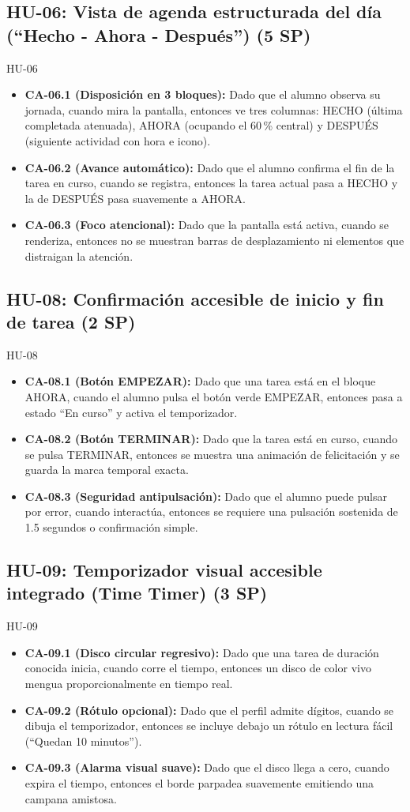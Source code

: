 \documentclass[11pt,a4paper]{article}
\newcommand{\ca}[2]{\item \textbf{#1:} #2}
\begin{document}
\subsection{HU-06: Vista de agenda estructurada del día (``Hecho - Ahora - Después'') (5 SP)}
\begin{criterios}{HU-06}
\begin{itemize}
\ca{CA-06.1 (Disposición en 3 bloques)}{Dado que el alumno observa su jornada, cuando mira la pantalla, entonces ve tres columnas: HECHO (última completada atenuada), AHORA (ocupando el 60\,\% central) y DESPUÉS (siguiente actividad con hora e icono).}
\ca{CA-06.2 (Avance automático)}{Dado que el alumno confirma el fin de la tarea en curso, cuando se registra, entonces la tarea actual pasa a HECHO y la de DESPUÉS pasa suavemente a AHORA.}
\ca{CA-06.3 (Foco atencional)}{Dado que la pantalla está activa, cuando se renderiza, entonces no se muestran barras de desplazamiento ni elementos que distraigan la atención.}
\end{itemize}
\end{criterios}

\subsection{HU-08: Confirmación accesible de inicio y fin de tarea (2 SP)}
\begin{criterios}{HU-08}
\begin{itemize}
\ca{CA-08.1 (Botón EMPEZAR)}{Dado que una tarea está en el bloque AHORA, cuando el alumno pulsa el botón verde EMPEZAR, entonces pasa a estado ``En curso'' y activa el temporizador.}
\ca{CA-08.2 (Botón TERMINAR)}{Dado que la tarea está en curso, cuando se pulsa TERMINAR, entonces se muestra una animación de felicitación y se guarda la marca temporal exacta.}
\ca{CA-08.3 (Seguridad antipulsación)}{Dado que el alumno puede pulsar por error, cuando interactúa, entonces se requiere una pulsación sostenida de 1.5 segundos o confirmación simple.}
\end{itemize}
\end{criterios}

\subsection{HU-09: Temporizador visual accesible integrado (Time Timer) (3 SP)}
\begin{criterios}{HU-09}
\begin{itemize}
\ca{CA-09.1 (Disco circular regresivo)}{Dado que una tarea de duración conocida inicia, cuando corre el tiempo, entonces un disco de color vivo mengua proporcionalmente en tiempo real.}
\ca{CA-09.2 (Rótulo opcional)}{Dado que el perfil admite dígitos, cuando se dibuja el temporizador, entonces se incluye debajo un rótulo en lectura fácil (``Quedan 10 minutos'').}
\ca{CA-09.3 (Alarma visual suave)}{Dado que el disco llega a cero, cuando expira el tiempo, entonces el borde parpadea suavemente emitiendo una campana amistosa.}
\end{itemize}
\end{criterios}
\end{document}

